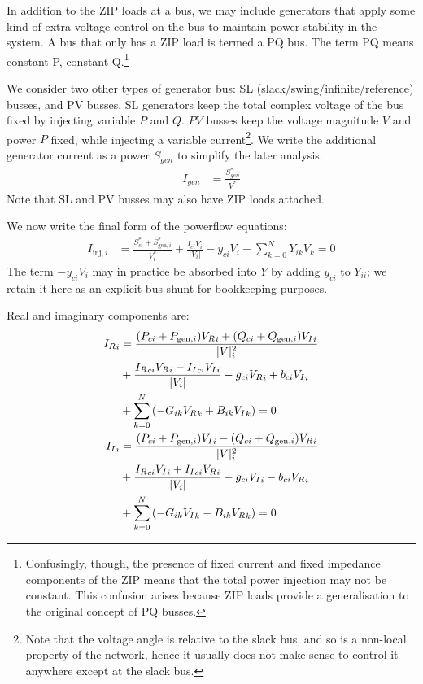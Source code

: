 \documentclass[11pt]{article}
\newcommand{\Vr}{{V_R}}
\newcommand{\Vi}{{V_I}}
\newcommand{\Ir}{{I_R}}
\newcommand{\Ii}{{I_I}}
\begin{document}
In addition to the ZIP loads at a bus, we may include generators that apply some kind of extra voltage control on the bus to maintain power stability in the system. A bus that only has a ZIP load is termed a PQ bus. The term PQ means constant P, constant Q.\footnote{Confusingly, though, the presence of fixed current and fixed impedance components of the ZIP means that the total power injection may not be constant. This confusion arises because ZIP loads provide a generalisation to the original concept of PQ busses.}

We consider two other types of generator bus: SL (slack/swing/infinite/reference) busses, and PV busses. SL generators keep the total complex voltage of the bus fixed by injecting variable $P$ and $Q$. $PV$ busses keep the voltage magnitude $V$ and power $P$ fixed, while injecting a variable current\footnote{Note that the voltage angle is relative to the slack bus, and so is a non-local property of the network, hence it usually does not make sense to control it anywhere except at the slack bus.}. We write the additional generator current as a power $S_{gen}$ to simplify the later analysis.
\begin{align}
I_{gen} &= \frac{S_{gen}^*}{V^*}
\end{align}
Note that SL and PV busses may also have ZIP loads attached.

We now write the final form of the powerflow equations:
\begin{align}
I_{\text{inj},i} &= \frac{S^*_{ci} + S^*_{\text{gen},i}}{V^*_i} + \frac{I_{ci}V_i}{|V_i|} - y_{ci}V_i - \sum_{k=0}^NY_{ik}V_k = 0
\label{EQ_POWERFLOW_COMPLEX}
\end{align}
The term $-y_{ci}V_i$ may in practice be absorbed into $Y$ by adding $y_{ci}$ to $Y_{ii}$; we retain it here as an explicit bus shunt for bookkeeping purposes.

Real and imaginary components are:
\begin{align}
	\Ir_i &= \frac{(P_{ci} + P_{\text{gen},i})\Vr_i + (Q_{ci} + Q_{\text{gen},i})\Vi_i}{|V|^2_i} \notag \\
	      &+ \frac{\Ir_{ci}\Vr_{i} - \Ii_{ci}\Vi_i}{|V_i|} -g_{ci}\Vr_i + b_{ci}\Vi_i \notag \\
	      &+ \sum_{k=0}^N\left(-G_{ik}\Vr_k + B_{ik}\Vi_k\right) = 0\\
	\Ii_i &= \frac{(P_{ci} + P_{\text{gen},i})\Vi_i - (Q_{ci} + Q_{\text{gen},i})\Vr_i}{|V|^2_i} \notag \\
	      &+ \frac{\Ir_{ci}\Vi_{i} + \Ii_{ci}\Vr_{i}}{|V_i|} -g_{ci}\Vi_i - b_{ci}\Vr_i \notag \\
	&+ \sum_{k=0}^N\left(-G_{ik}\Vi_k - B_{ik}\Vr_k\right) = 0
\end{align}
\end{document}
